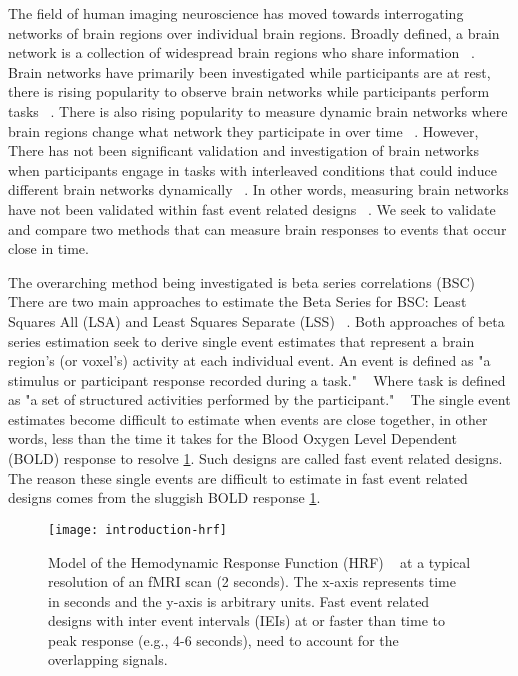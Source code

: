 \documentclass[10pt,letterpaper]{article}
\begin{document}
The field of human imaging neuroscience has moved towards interrogating networks of brain regions
over individual brain regions.
Broadly defined, a brain network is a collection of widespread brain regions who share information ~\cite{Uddin2019}.
Brain networks have primarily been investigated while participants are at rest, there
is rising popularity to observe brain networks while participants perform tasks ~\cite{Cole2014a}.
There is also rising popularity to measure dynamic brain networks where brain regions change
what network they participate in over time ~\cite{Sakoglu2008,Hindriks2016}.
However, There has not been significant validation and investigation of brain networks
when participants engage in tasks with interleaved conditions that could induce
different brain networks dynamically ~\cite{Di2019a}.
In other words, measuring brain networks have not been validated within fast event related designs ~\cite{Buckner1998}.
We seek to validate and compare two methods that can measure brain responses to events that occur
close in time.

The overarching method being investigated is beta series correlations (BSC) ~\cite{Rissman2004,Mumford2012,Turner2012a,Abdulrahman2016}
There are two main approaches to estimate the Beta Series for BSC: Least Squares All (LSA) and Least Squares Separate (LSS) ~\cite{Mumford2012}.
Both approaches of beta series estimation seek to derive single event estimates that represent a brain region's
(or voxel's) activity at each individual event.
An event is defined as "a stimulus or participant response recorded during a task." ~\cite{Gorgolewski2016}
Where task is defined as "a set of structured activities performed by the participant." ~\cite{Gorgolewski2016}
The single event estimates become difficult to estimate when events are close together,
in other words, less than the time it takes for the Blood Oxygen Level Dependent (BOLD) response to resolve \ref{fig:introhrf}.
Such designs are called fast event related designs.
The reason these single events are difficult to estimate in fast event related designs comes from
the sluggish BOLD response \ref{fig:introhrf}.

\begin{figure}[H]
  \centering
  \texttt{[image: introduction-hrf]}
  \caption{
    Model of the Hemodynamic Response Function (HRF) ~\cite{Glover1999} at a
    typical resolution of an fMRI scan (2 seconds).
    The x-axis represents time in seconds and the y-axis is arbitrary units.
    Fast event related designs with inter event intervals (IEIs) at or faster than time to peak
    response (e.g., 4-6 seconds), need to account for the overlapping signals.
  }
  \label{fig:introhrf}
\end{figure}
\end{document}
